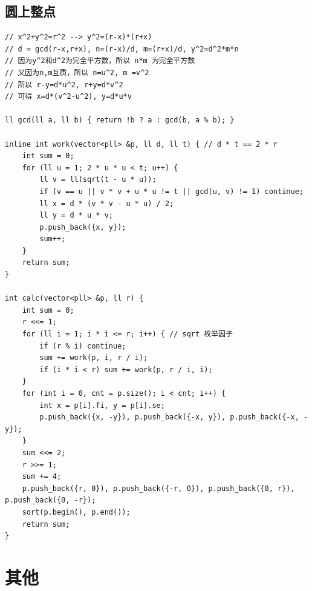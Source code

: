 \documentclass[twoside]{article}
\begin{document}
\subsection{圆上整点}
\begin{lstlisting}
// x^2+y^2=r^2 --> y^2=(r-x)*(r+x)
// d = gcd(r-x,r+x), n=(r-x)/d, m=(r+x)/d, y^2=d^2*m*n
// 因为y^2和d^2为完全平方数，所以 n*m 为完全平方数
// 又因为n,m互质，所以 n=u^2, m =v^2
// 所以 r-y=d*u^2, r+y=d*v^2
// 可得 x=d*(v^2-u^2), y=d*u*v

ll gcd(ll a, ll b) { return !b ? a : gcd(b, a % b); }

inline int work(vector<pll> &p, ll d, ll t) { // d * t == 2 * r
    int sum = 0;
    for (ll u = 1; 2 * u * u < t; u++) {
        ll v = ll(sqrt(t - u * u));
        if (v == u || v * v + u * u != t || gcd(u, v) != 1) continue;
        ll x = d * (v * v - u * u) / 2;
        ll y = d * u * v;
        p.push_back({x, y});
        sum++;
    }
    return sum;
}

int calc(vector<pll> &p, ll r) {
    int sum = 0;
    r <<= 1;
    for (ll i = 1; i * i <= r; i++) { // sqrt 枚举因子
        if (r % i) continue;
        sum += work(p, i, r / i);
        if (i * i < r) sum += work(p, r / i, i);
    }
    for (int i = 0, cnt = p.size(); i < cnt; i++) {
        int x = p[i].fi, y = p[i].se;
        p.push_back({x, -y}), p.push_back({-x, y}), p.push_back({-x, -y});
    }
    sum <<= 2;
    r >>= 1;
    sum += 4;
    p.push_back({r, 0}), p.push_back({-r, 0}), p.push_back({0, r}), p.push_back({0, -r});
    sort(p.begin(), p.end());
    return sum;
}\end{lstlisting}
\clearpage\section{其他}
\end{document}

